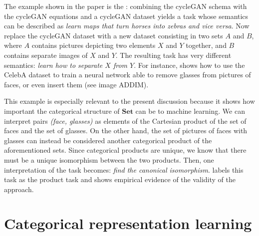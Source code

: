 \documentclass[11pt,a4paper,openright,twoside]{report}
\theoremstyle{plain}
\theoremstyle{definition}
\begin{document}
The example shown in the paper is the \cite{gavranovic2019compositional}: combining the cycleGAN schema with the cycleGAN equations and a cycleGAN dataset yields a task whose semantics can be described as \textit{learn maps that turn horses into zebras and vice versa}. Now replace the cycleGAN dataset with a new dataset consisting in two sets $A$ and $B$, where $A$ contains pictures depicting two elements $X$ and $Y$ together, and $B$ contains separate images of $X$ and $Y$. The resulting task has very different semantics: \textit{learn how to separate $X$ from $Y$}. For instance, \cite{gavranovic2019compositional} shows how to use the CelebA dataset to train a neural network able to remove glasses from pictures of faces, or even insert them (see image ADDIM).


This example is especially relevant to the present discussion because it shows how important the categorical structure of $\mathbf{Set}$ can be to machine learning. We can interpret pairs \textit{(face, glasses)} as elements of the Cartesian product of the set of faces and the set of glasses. On the other hand, the set of pictures of faces with glasses can instead be considered another categorical product of the aforementioned sets. Since categorical products are unique, we know that there must be a unique isomorphism between the two products. Then, one interpretation of the task becomes: \textit{find the canonical isomorphism}. \cite{gavranovic2019compositional} labels this task as the product task and shows empirical evidence of the validity of the approach.





\section{Categorical representation learning}
\end{document}
